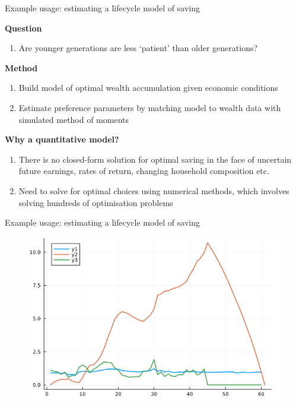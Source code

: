 \documentclass[aspectratio=169]{beamer}
\begin{document}
\begin{frame}{Example usage: estimating a lifecycle model of saving}

\textbf{Question}
\begin{enumerate}
	\item Are younger generations are less `patient' than older generations?
\end{enumerate}

\vspace{0.5cm} 

\textbf{Method}
\begin{enumerate}
	\item Build model of optimal wealth accumulation given economic conditions
	\item Estimate preference parameters by matching model to wealth data with simulated method of moments
\end{enumerate}

\vspace{0.5cm} 

\textbf{Why a quantitative model?}
\begin{enumerate}
	\item There is no closed-form solution for optimal saving in the face of uncertain future earnings, rates of return, changing household composition etc.
	\item Need to solve for optimal choices using numerical methods, which involves solving hundreds of optimisation problems
\end{enumerate}

\end{frame}

\begin{frame}{Example usage: estimating a lifecycle model of saving}

\begin{figure}
\includegraphics[height=0.7\textheight]{figures/lifecycle1.png}
\end{figure}

\end{frame}
\end{document}
